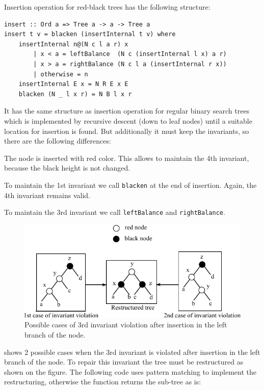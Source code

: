 \documentclass{tmr}
\begin{document}
Insertion operation for red-black trees has the following structure:

\begin{Verbatim}
insert :: Ord a => Tree a -> a -> Tree a
insert t v = blacken (insertInternal t v) where
    insertInternal n@(N c l a r) x
        | x < a = leftBalance  (N c (insertInternal l x) a r)
        | x > a = rightBalance (N c l a (insertInternal r x))
        | otherwise = n
    insertInternal E x = N R E x E
    blacken (N _ l x r) = N B l x r
\end{Verbatim}

It has the same structure as insertion operation for regular binary search trees which is implemented by recursive descent (down to leaf nodes) until a suitable location for insertion is found. But additionally it must keep the invariants, so there are the following differences:

\begin{longitem}
\item The node is inserted with red color. This allows to maintain the 4th invariant, because the black height is not changed.
\item To maintain the 1st invariant we call \verb|blacken| at the end of insertion. Again, the 4th invariant remains valid.
\item To maintain the 3rd invariant we call \verb|leftBalance| and \verb|rightBalance|.
\end{longitem}
 
\begin{figure}
\centering
\includegraphics{balancing}
\vspace{5pt}
\caption{Possible cases of 3rd invariant violation after insertion in the left branch of the node.}
\label{fig:balancing}
\end{figure}

 shows 2 possible cases when the 3rd invariant is violated after insertion in the left branch of the node. To repair this invariant the tree must be restructured as shown on the figure. The following code uses pattern matching to implement the restructuring, otherwise the function returns the sub-tree as is:
\end{document}

